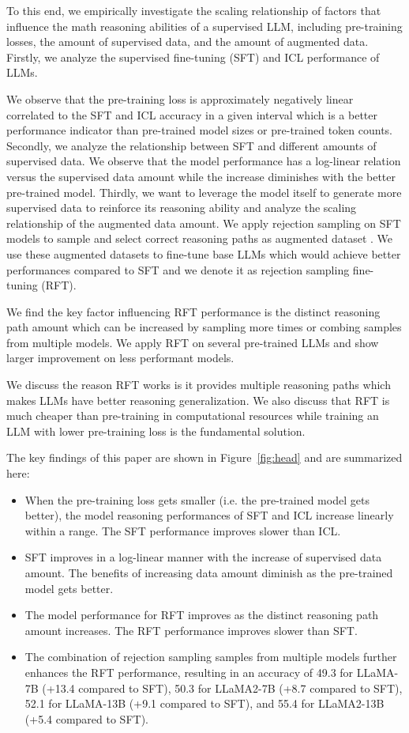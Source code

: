 To this end, we empirically investigate the scaling relationship of factors that influence the math reasoning abilities of a supervised LLM, including pre-training losses, the amount of supervised data, and the amount of augmented data. Firstly, we analyze the supervised fine-tuning (SFT) and ICL performance of LLMs.

We observe that the pre-training loss is approximately negatively linear correlated to the SFT and ICL accuracy in a given interval which is a better performance indicator than pre-trained model sizes or pre-trained token counts. Secondly, we analyze the relationship between SFT and different amounts of supervised data. We observe that the model performance has a log-linear relation versus the supervised data amount while the increase diminishes with the better pre-trained model. Thirdly, we want to leverage the model itself to generate more supervised data to reinforce its reasoning ability and analyze the scaling relationship of the augmented data amount. We apply rejection sampling on SFT models to sample and select correct reasoning paths as augmented dataset \citep{uesato2022solving,zhu-etal-2023-solving}. We use these augmented datasets to fine-tune base LLMs which would achieve better performances compared to SFT and we denote it as rejection sampling fine-tuning (RFT).

We find the key factor influencing RFT performance is the distinct reasoning path amount which can be increased by sampling more times or combing samples from multiple models. We apply RFT on several pre-trained LLMs and show larger improvement on less performant models.

We discuss the reason RFT works is it provides multiple reasoning paths which makes LLMs have better reasoning generalization. We also discuss that RFT is much cheaper than pre-training in computational resources while training an LLM with lower pre-training loss is the fundamental solution.

The key findings of this paper are shown in Figure~\ref{fig:head} and are summarized here:

\begin{itemize}

\item When the pre-training loss gets smaller (i.e. the pre-trained model gets better), the model reasoning performances of SFT and ICL increase linearly within a range. The SFT performance improves slower than ICL.
\item SFT improves in a log-linear manner with the increase of supervised data amount. The benefits of increasing data amount diminish as the pre-trained model gets better.
\item The model performance for RFT improves as the distinct reasoning path amount increases. The RFT performance improves slower than SFT.
\item The combination of rejection sampling samples from multiple models further enhances the RFT performance, resulting in an accuracy of 49.3 for LLaMA-7B (+13.4 compared to SFT), 50.3 for LLaMA2-7B (+8.7 compared to SFT), 52.1 for LLaMA-13B (+9.1 compared to SFT), and 55.4 for LLaMA2-13B (+5.4 compared to SFT).
\end{itemize}

